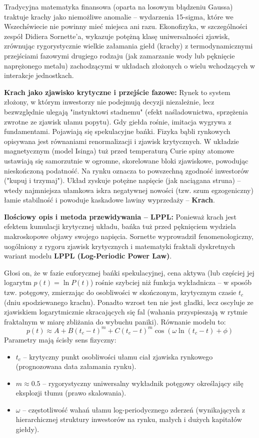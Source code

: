 \documentclass[11pt, a4paper]{article}
\begin{document}
Tradycyjna matematyka finansowa (oparta na losowym błądzeniu Gaussa) traktuje krachy jako niemożliwe anomalie – wydarzenia 15-sigma, które we Wszechświecie nie powinny mieć miejsca ani razu. Ekonofizyka, w szczególności zespół Didiera Sornette'a, wykazuje potężną klasę uniwersalności zjawisk, zrównując rygorystycznie wielkie załamania giełd (krachy) z termodynamicznymi przejściami fazowymi drugiego rodzaju (jak zamarzanie wody lub pęknięcie naprężonego metalu) zachodzącymi w układach złożonych o wielu wchodzących w interakcje jednostkach.

\textbf{Krach jako zjawisko krytyczne i przejście fazowe:}
Rynek to system złożony, w którym inwestorzy nie podejmują decyzji niezależnie, lecz bezwzględnie ulegają "instynktowi stadnemu" (efekt naśladownictwa, sprzężenia zwrotne ze zjawisk ułamu popytu). Gdy giełda rośnie, imitacja wygrywa z fundamentami. Pojawiają się spekulacyjne bańki. 
Fizyka bąbli rynkowych opisywana jest równaniami renormalizacji i zjawisk krytycznych. W układzie magnetycznym (model Isinga) tuż przed temperaturą Curie spiny atomowe ustawiają się samorzutnie w ogromne, skorelowane bloki zjawiskowe, powodując nieskończoną podatność. Na rynku oznacza to powszechną zgodność inwestorów ("kupuj i trzymaj"). Układ zyskuje potężne napięcie (jak naciągana struna) – wtedy najmniejsza ułamkowa iskra negatywnej nowości (tzw. szum egzogeniczny) łamie stabilność i powoduje kaskadowe lawiny wyprzedaży – \textbf{Krach}.

\textbf{Ilościowy opis i metoda przewidywania – LPPL:}
Ponieważ krach jest efektem kumulacji krytycznej układu, bańka tuż przed pęknięciem wydziela makroskopowe objawy swojego napięcia. Sornette wyprowadził fenomenologiczny, uogólniony z rygoru zjawisk krytycznych i matematyki fraktali dyskretnych wariant modelu \textbf{LPPL (Log-Periodic Power Law)}.

Głosi on, że w fazie euforycznej bańki spekulacyjnej, cena aktywa (lub częściej jej logarytm $p(t) = \ln P(t)$) rośnie szybciej niż funkcja wykładnicza – w sposób tzw. potęgowy, zmierzając do osobliwości w skończonym, krytycznym czasie $t_c$ (dniu spodziewanego krachu). Ponadto wzrost ten nie jest gładki, lecz oscyluje ze zjawiskiem logarytmicznie skracających się fal (wahania przyspieszają w rytmie fraktalnym w miarę zbliżania do wybuchu paniki).
Równanie modelu to:
\[
p(t) \approx A + B(t_c - t)^m + C(t_c - t)^m \cos(\omega \ln(t_c - t) + \phi)
\]
Parametry mają ścisły sens fizyczny:
\begin{itemize}
    \item $t_c$ – krytyczny punkt osobliwości ułamu ciał zjawiska rynkowego (prognozowana data załamania rynku).
    \item $m \approx 0.5$ – rygorystyczny uniwersalny wykładnik potęgowy określający siłę eksplozji tłumu (prawo skalowania).
    \item $\omega$ – częstotliwość wahań ułamu log-periodycznego zderzeń (wynikających z hierarchicznej struktury inwestorów na rynku, małych i dużych kapitałów giełdy).
\end{itemize}
\end{document}

